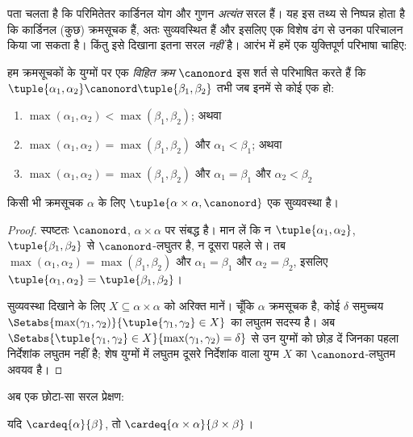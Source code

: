 \documentclass[../../../include/open-logic-section]{subfiles}
\begin{document}


पता चलता है कि परिमितेतर कार्डिनल योग और गुणन \emph{अत्यंत} सरल हैं। यह इस
तथ्य से निष्पन्न होता है कि कार्डिनल (कुछ) क्रमसूचक हैं, अतः सुव्यवस्थित हैं
और इसलिए एक विशेष ढंग से उनका परिचालन किया जा सकता है। किंतु इसे दिखाना
इतना सरल \emph{नहीं} है। आरंभ में हमें एक युक्तिपूर्ण परिभाषा चाहिए:

\begin{defn}
हम क्रमसूचकों के युग्मों पर एक \emph{विहित क्रम} $\canonord$ इस शर्त से
परिभाषित करते हैं कि $\tuple{\alpha_1,\alpha_2}\canonord
\tuple{\beta_1,\beta_2}$ तभी जब इनमें से कोई एक हो:
\begin{enumerate}
	\item $\max(\alpha_1, \alpha_2)<\max(\beta_1, \beta_2)$; अथवा
	\item $\max(\alpha_1, \alpha_2) = \max(\beta_1, \beta_2)$ और
	$\alpha_1 < \beta_1$; अथवा
	\item $\max(\alpha_1, \alpha_2) = \max(\beta_1, \beta_2)$ और
	$\alpha_1 = \beta_1$ और $\alpha_2 < \beta_2$
\end{enumerate}
\end{defn}

\begin{lem}
किसी भी क्रमसूचक $\alpha$ के लिए
$\tuple{\alpha\times\alpha,\canonord}$ एक सुव्यवस्था है।
\end{lem}

\begin{proof}
स्पष्टतः $\canonord$, $\alpha\times\alpha$ पर संबद्ध है। मान लें कि न
$\tuple{\alpha_1,\alpha_2}$, $\tuple{\beta_1,\beta_2}$ से
$\canonord$-लघुतर है, न दूसरा पहले से। तब
$\max(\alpha_1,\alpha_2)=\max(\beta_1,\beta_2)$ और
$\alpha_1=\beta_1$ और $\alpha_2=\beta_2$, इसलिए
$\tuple{\alpha_1,\alpha_2}=\tuple{\beta_1,\beta_2}$।

सुव्यवस्था दिखाने के लिए $X\subseteq\alpha\times\alpha$ को अरिक्त मानें।
चूँकि $\alpha$ क्रमसूचक है, कोई $\delta$ समुच्चय
$\Setabs{\max(\gamma_1,\gamma_2)}{\tuple{\gamma_1,\gamma_2}\in X}$ का
लघुतम सदस्य है। अब
$\Setabs{\tuple{\gamma_1,\gamma_2}\in X}{\max(\gamma_1,\gamma_2)=\delta}$
से उन युग्मों को छोड़ दें जिनका पहला निर्देशांक लघुतम नहीं है; शेष युग्मों
में लघुतम दूसरे निर्देशांक वाला युग्म $X$ का $\canonord$-लघुतम अवयव है।
\end{proof}
\noindent
अब एक छोटा-सा सरल प्रेक्षण:

\begin{prop}
यदि $\cardeq{\alpha}{\beta}$, तो
$\cardeq{\alpha\times\alpha}{\beta\times\beta}$।
\end{prop}
\end{document}
